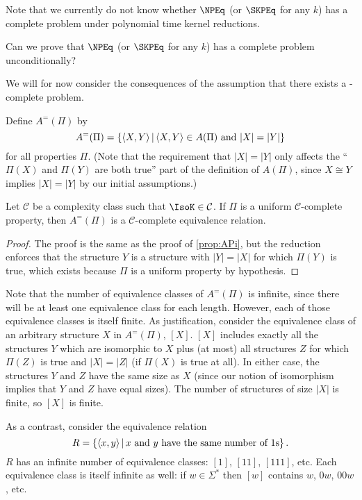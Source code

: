 Note that we currently do not know whether $\NPEq$ (or $\SKPEq$ for any $k$) has a complete problem under polynomial time kernel reductions.
\begin{openproblem}
  Can we prove that $\NPEq$ (or $\SKPEq$ for any $k$) has a complete problem unconditionally?
\end{openproblem}

We will for now consider the consequences of the assumption that there exists a \CEq-complete problem.

Define $A^=(\Pi)$ by
\begin{displaymath}
  A^=(\Pi) = \left\{ \left\langle X,Y\right\rangle \,\middle|\, \left\langle X,Y\right\rangle\in A(\Pi) \text{ and } |X|=|Y|\right\}
\end{displaymath}
for all properties $\Pi$.
(Note that the requirement that $|X|=|Y|$ only affects the ``$\Pi(X)$ and $\Pi(Y)$ are both true'' part of the definition of $A(\Pi)$, since $X\cong Y$ implies $|X|=|Y|$ by our initial assumptions.)

\begin{proposition}\label{prop:APieq}
  Let $\mathcal{C}$ be a complexity class such that $\IsoK\in\mathcal{C}$.
  If $\Pi$ is a uniform $\mathcal{C}$-complete property, then $A^=(\Pi)$ is a $\mathcal{C}$-complete equivalence relation.
\end{proposition}
\begin{proof}
  The proof is the same as the proof of \autoref{prop:APi}, but the reduction enforces that the structure $Y$ is a structure with $|Y|=|X|$ for which $\Pi(Y)$ is true, which exists because $\Pi$ is a uniform property by hypothesis.
\end{proof}

Note that the number of equivalence classes of $A^=(\Pi)$ is infinite, since there will be at least one equivalence class for each length.
However, each of those equivalence classes is itself finite.
As justification, consider the equivalence class of an arbitrary structure $X$ in $A^=(\Pi)$, $[X]$.
$[X]$ includes exactly all the structures $Y$ which are isomorphic to $X$ plus (at most) all structures $Z$ for which $\Pi(Z)$ is true and $|X|=|Z|$ (if $\Pi(X)$ is true at all).
In either case, the structures $Y$ and $Z$ have the same size as $X$ (since our notion of isomorphism implies that $Y$ and $Z$ have equal sizes).
The number of structures of size $|X|$ is finite, so $[X]$ is finite.

As a contrast, consider the equivalence relation
\begin{displaymath}
  R=\left\{\left\langle x,y\right\rangle \,\middle|\, x\text{ and }y\text{ have the same number of }1\textnormal{s}\right\}.
\end{displaymath}
$R$ has an infinite number of equivalence classes: $[1]$, $[11]$, $[111]$, etc.
Each equivalence class is itself infinite as well: if $w\in\Sigma^*$ then $[w]$ contains $w$, $0w$, $00w$, etc.

